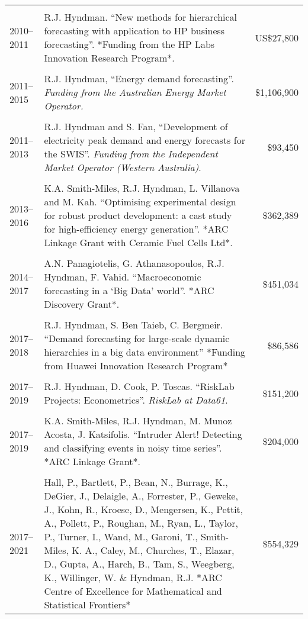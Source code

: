 \documentclass[10pt,a4paper,]{article}
\begin{document}
\begin{tabular}{@{}lP{13.3cm}r@{}}
\\\\[-0.2cm]
2010--2011 & R.J. Hyndman. ``New methods for hierarchical forecasting with application to HP business forecasting''. *Funding from the HP Labs Innovation Research Program*. &US\$27,800
\\\\[-0.2cm]
2011--2015 & R.J. Hyndman, ``Energy demand forecasting''. \emph{Funding from the Australian Energy Market Operator.} &\$1,106,900
\\\\[-0.2cm]
2011--2013 & R.J. Hyndman and S. Fan, ``Development of electricity peak demand and energy forecasts for the SWIS''. \emph{Funding from the Independent Market Operator (Western Australia)}. &\$93,450
\\\\[-0.2cm]
2013--2016 & K.A. Smith-Miles, R.J. Hyndman, L. Villanova and M. Kah. ``Optimising experimental design for robust product development: a cast study for high-efficiency energy generation''. *ARC Linkage Grant with Ceramic Fuel Cells Ltd*. & \$362,389
\\\\[-0.2cm]
2014--2017 & A.N. Panagiotelis, G. Athanasopoulos, R.J. Hyndman, F. Vahid. ``Macroeconomic forecasting in a `Big Data' world''. *ARC Discovery Grant*.& \$451,034
\\\\[-0.2cm]
2017--2018 & R.J. Hyndman, S. Ben Taieb, C. Bergmeir. ``Demand forecasting for large-scale dynamic hierarchies in a big data environment'' *Funding from Huawei Innovation Research Program* & \$86,586
\\\\[-0.2cm]
2017--2019& R.J. Hyndman, D. Cook, P. Toscas. ``RiskLab Projects: Econometrics''. \emph{RiskLab at Data61}. & \$151,200
\\\\[-0.2cm]
2017--2019 & K.A. Smith-Miles, R.J. Hyndman, M. Munoz Acosta, J. Katsifolis. ``Intruder Alert! Detecting and classifying events in noisy time series''. *ARC Linkage Grant*. & \$204,000
\\\\[-0.2cm]
2017--2021 & Hall, P., Bartlett, P., Bean, N., Burrage, K., DeGier, J., Delaigle, A., Forrester, P., Geweke, J., Kohn, R., Kroese, D., Mengersen, K., Pettit, A., Pollett, P., Roughan, M., Ryan, L., Taylor, P., Turner, I., Wand, M., Garoni, T., Smith-Miles, K. A., Caley, M., Churches, T., Elazar, D., Gupta, A., Harch, B., Tam, S., Weegberg, K., Willinger, W. \& Hyndman, R.J. *ARC Centre of Excellence for Mathematical and Statistical Frontiers* & \$554,329
\\
\bottomrule
\end{tabular}
\end{document}
